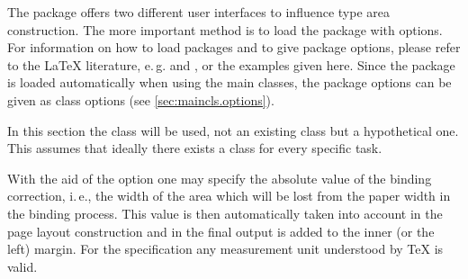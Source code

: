 The package  offers two different user interfaces to
influence type area construction. The more important method is to load
the package with options. For information on how to load packages and
to give package options, please refer to the {\LaTeX} literature,
e.\,g.  \cite{lshort} and \cite{latex:usrguide}, or the examples given
here.  Since the  package is loaded automatically
when using the {\KOMAScript} main classes, the package options can be
given as class options (see \autoref{sec:maincls.options}).

In this section the  class will be used, not an
existing {\KOMAScript} class but a hypothetical one. This assumes that ideally there exists a class for
every specific task.

%
\begin{Declaration}
\end{Declaration}%
With the aid of the option
one may specify the absolute value of the binding
correction, i.\,e., the width of the area
which will be lost from the paper width in the binding process. This
value is then automatically taken into account in the page layout
construction and in the final output is added to the inner (or the
left) margin. For the  specification any measurement
unit understood by \TeX{} is valid.

